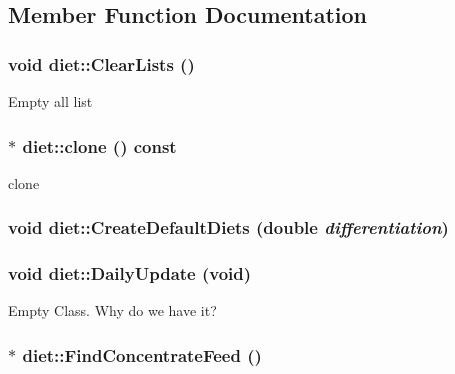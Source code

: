 \subsection{Member Function Documentation}
\hypertarget{classdiet_a2232697991c7292a66bf920eacd8f8de}{
\subsubsection[{ClearLists}]{\setlength{\rightskip}{0pt plus 5cm}void diet::ClearLists ()}}
\label{classdiet_a2232697991c7292a66bf920eacd8f8de}
Empty all list \hypertarget{classdiet_aeb5ccbac2a03f2eff34a332699bd6fb0}{
\subsubsection[{clone}]{ $\ast$ diet::clone () const}}
\label{classdiet_aeb5ccbac2a03f2eff34a332699bd6fb0}
clone \hypertarget{classdiet_a8444b527fbd89b0c61ebff4413d53516}{
\subsubsection[{CreateDefaultDiets}]{\setlength{\rightskip}{0pt plus 5cm}void diet::CreateDefaultDiets (double {\em differentiation})}}
\label{classdiet_a8444b527fbd89b0c61ebff4413d53516}
\hypertarget{classdiet_af16ff6316a93c7e9c45fed7e0a7aaaaa}{
\subsubsection[{DailyUpdate}]{\setlength{\rightskip}{0pt plus 5cm}void diet::DailyUpdate (void)}}
\label{classdiet_af16ff6316a93c7e9c45fed7e0a7aaaaa}
Empty Class. Why do we have it? \hypertarget{classdiet_a4ea8bc5fea836aedba836343ab6b5376}{
\subsubsection[{FindConcentrateFeed}]{ $\ast$ diet::FindConcentrateFeed ()}}
